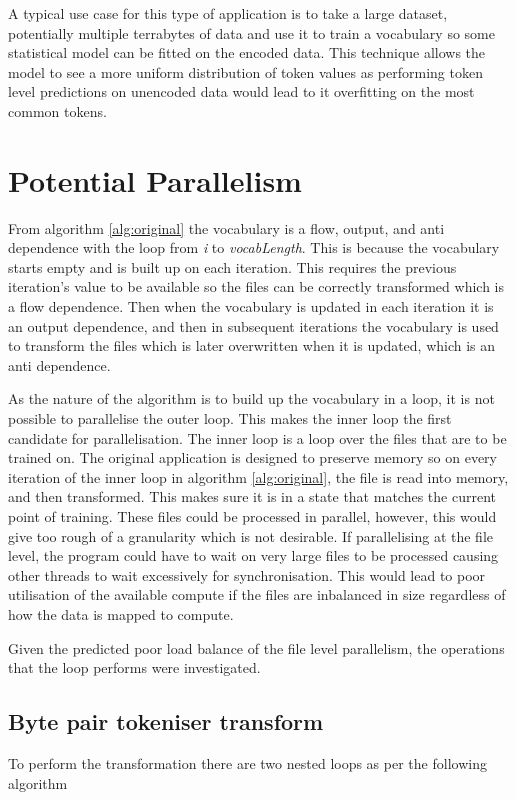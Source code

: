 \documentclass{article}
\begin{document}
A typical use case for this type of application is to take a large dataset, potentially multiple terrabytes of
data and use it to train a vocabulary so some statistical model can be fitted on the encoded data. 
This technique allows the model to see a more uniform distribution of token values as performing
token level predictions on unencoded data would lead to it overfitting on the most common tokens.

\section{Potential Parallelism}
From algorithm \ref{alg:original} the vocabulary is a 
flow, output, and anti dependence with the loop from \textit{i} to \textit{vocabLength}. This is
because the vocabulary starts empty and is built up on each iteration. This requires the previous 
iteration's value to be available so the files can be correctly transformed which is a flow dependence.
Then when the vocabulary is updated in each iteration it is an output dependence, and then in subsequent
iterations the vocabulary is used to transform the files which is later overwritten when it is updated, which is an anti dependence.

As the nature of the algorithm is to build up the vocabulary in a loop, it is not possible to parallelise the outer loop. 
This makes the inner loop the first candidate for parallelisation. The inner loop is a loop over the files that are to be trained on.
The original application is designed to preserve memory so on every iteration of the inner loop in algorithm \ref{alg:original}, 
the file is read into memory, and then transformed. This makes sure it is in a state that matches the current point of training.
These files could be processed in parallel, however, this would give too rough of a granularity which is not desirable. 
If parallelising at the file level, the program could have to wait on very large files to be processed 
causing other threads to wait excessively for synchronisation. This would lead to poor utilisation of the available compute if the files are 
inbalanced in size regardless of how the data is mapped to compute.

Given the predicted poor load balance of the file level parallelism, the operations that the loop performs
were investigated. 

\subsection{Byte pair tokeniser transform}
To perform the transformation there are two nested loops as per the following algorithm
\end{document}
